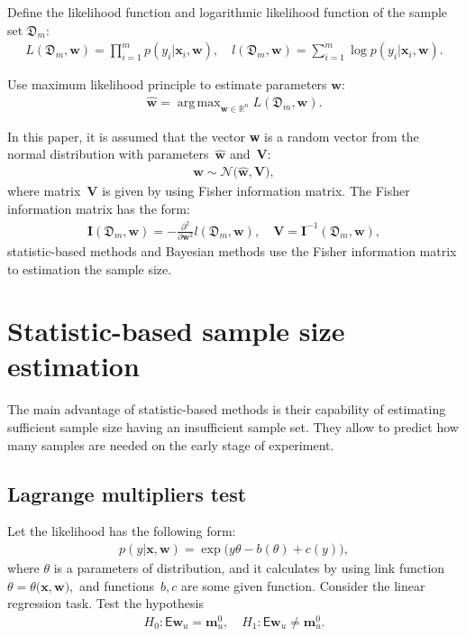 \documentclass[
11pt,%
tightenlines,%
twoside,%
onecolumn,%
nofloats,%
nobibnotes,%
nofootinbib,%
superscriptaddress,%
noshowpacs,%
centertags]%
{revtex4}
\DeclareMathOperator*{\argmax}{arg\,max}
\begin{document}
Define the likelihood function and logarithmic likelihood function of the sample set $\mathfrak{D}_{m}$:
\[
\label{eq:ps:4}
\begin{aligned}
	L\left(\mathfrak{D}_{m}, \textbf{w}\right) = \prod_{i=1}^{m} p\left(y_{i}|\textbf{x}_{i}, \textbf{w}\right),\quad l\left(\mathfrak{D}_{m}, \textbf{w}\right) = \sum_{i=1}^{m} \log p\left(y_i|\textbf{x}_{i}, \textbf{w}\right).
\end{aligned}
\]

Use maximum likelihood principle to estimate parameters $\textbf{w}$:
\[
\label{eq:ps:5}
\begin{aligned}
	\hat{\textbf{w}} = \argmax_{\textbf{w}\in\mathbb{R}^{n}}L\left(\mathfrak{D}_{m}, \textbf{w}\right).
\end{aligned}
\]

In this paper, it is assumed that the vector \textbf{w} is a random vector from the normal distribution with parameters~$\hat{\textbf{w}}$ and~$\mathbf{V}$:
\[
\label{eq:ps:5'}
\begin{aligned}
    \textbf{w} \sim \mathcal{N}\bigr(\hat{\textbf{w}}, \mathbf{V}\bigr),
\end{aligned}
\]
where matrix~$\mathbf{V}$ is given by using Fisher information matrix. The Fisher information matrix has the form:
\[
\label{eq:ps:6}
\begin{aligned}
	\textbf{I}\left(\mathfrak{D}_{m}, \textbf{w}\right) = -\frac{\partial^2}{\partial \textbf{w}^{2}}l\left(\mathfrak{D}_{m}, \textbf{w}\right), \quad  \textbf{V} = \textbf{I}^{-1}\left(\mathfrak{D}_{m}, \textbf{w}\right),
\end{aligned}
\]
statistic-based methods and Bayesian methods use the Fisher information matrix to estimation the sample size.

\section{Statistic-based sample size estimation}
The main advantage of statistic-based methods is their capability of estimating sufficient sample size having an insufficient sample set. They allow to predict how many samples are needed on the early stage of experiment.

\subsection{Lagrange multipliers test}
Let the likelihood has the following form:
\[
\label{eq:sb:1}
\begin{aligned}
	p(y|\mathbf{x}, \mathbf{w}) = \exp\bigl(y\theta- b(\theta) + c\left(y\right)\bigr),
\end{aligned}
\]
where $\theta$ is a parameters of distribution, and it calculates by using link function $\theta=\theta\bigr(\mathbf{x}, \mathbf{w}\bigr),$ and functions~$b, c$ are some given function. Consider the linear regression task. Test the hypothesis
\[
\label{eq:sb:2}
\begin{aligned}
	H_0: \mathsf{E}\textbf{w}_{u} = \textbf{m}^0_{u}, \quad H_1: \mathsf{E}\textbf{w}_{u} \not= \textbf{m}^0_{u}.
\end{aligned}
\]
\end{document}
